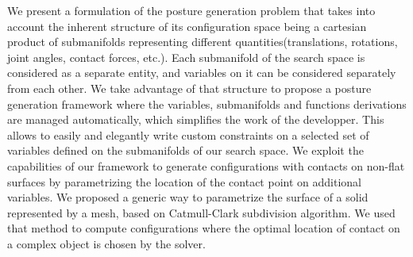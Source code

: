 We present a formulation of the posture generation problem that takes into account the inherent structure of its configuration space being a cartesian product of submanifolds representing different quantities(translations, rotations, joint angles, contact forces, etc.).
Each submanifold of the search space is considered as a separate entity, and variables on it can be considered separately from each other.
We take advantage of that structure to propose a posture generation framework where the variables, submanifolds and functions derivations are managed automatically, which simplifies the work of the developper.
This allows to easily and elegantly write custom constraints on a selected set of variables defined on the submanifolds of our search space.
We exploit the capabilities of our framework to generate configurations with contacts on non-flat surfaces by parametrizing the location of the contact point on additional variables.
We proposed a generic way to parametrize the surface of a solid represented by a mesh, based on Catmull-Clark subdivision algorithm.
We used that method to compute configurations where the optimal location of contact on a complex object is chosen by the solver.





